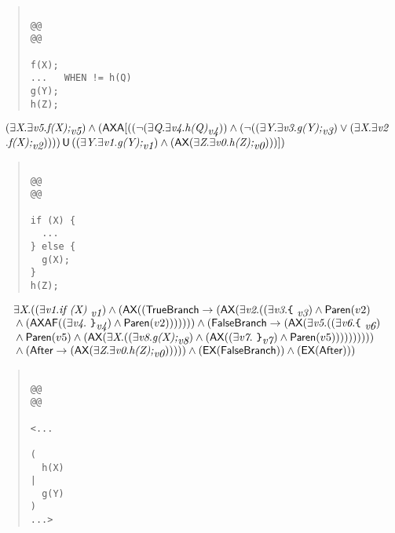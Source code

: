 \documentclass{article}
\newcommand{\U}{\,\mbox{\sf{U}}\,}
\newcommand{\A}{\mbox{\sf{A}}}
\newcommand{\AX}{\mbox{\sf{AX}}}
\newcommand{\EX}{\mbox{\sf{EX}}}
\newcommand{\AF}{\mbox{\sf{AF}}}
\newcommand{\mita}[1]{\mbox{\it{{#1}}}}
\newcommand{\msf}[1]{\mbox{\sf{{#1}}}}
\newcommand{\ttlb}{\mbox{\tt \char'173}}
\newcommand{\ttrb}{\mbox{\tt \char'175}}
\begin{document}
\begin{quote}\begin{verbatim}

@@
@@

f(X);
...   WHEN != h(Q)
g(Y);
h(Z);
\end{verbatim}\end{quote}

\[\begin{array}{l}
(\exists \mita{X} . \exists \mita{v5} . \mita{f(X);}_{\mita{v5}}) \wedge (\AX\A[((\neg (\exists \mita{Q} . \exists \mita{v4} . \mita{h(Q)}_{\mita{v4}})) \wedge (\neg ((\exists \mita{Y} . \exists \mita{v3} . \mita{g(Y);}_{\mita{v3}}) \vee (\exists \mita{X} . \exists \mita{v2}\\\mbox{} . \mita{f(X);}_{\mita{v2}})))) \U ((\exists \mita{Y} . \exists \mita{v1} . \mita{g(Y);}_{\mita{v1}}) \wedge (\AX(\exists \mita{Z} . \exists \mita{v0} . \mita{h(Z);}_{\mita{v0}})))]
)
\end{array}\]

\begin{quote}\begin{verbatim}

@@
@@

if (X) {
  ...
} else {
  g(X);
}
h(Z);
\end{verbatim}\end{quote}

\[\begin{array}{l}
\exists \mita{X} . ((\exists \mita{v1} . \mita{if (X) }_{\mita{v1}}) \wedge (\AX((\msf{TrueBranch} \rightarrow (\AX(\exists \mita{v2} . ((\exists \mita{v3} . \mita{{\ttlb}
  }_{\mita{v3}}) \wedge \msf{Paren}(v2)\\\mbox{} \wedge (\AX\AF((\exists \mita{v4} . \mita{
{\ttrb}}_{\mita{v4}}) \wedge \msf{Paren}(v2))))))) \wedge (\msf{FalseBranch} \rightarrow (\AX(\exists \mita{v5} . ((\exists \mita{v6} . \mita{{\ttlb}
  }_{\mita{v6}})\\\mbox{} \wedge \msf{Paren}(v5) \wedge (\AX(\exists \mita{X} . ((\exists \mita{v8} . \mita{g(X);}_{\mita{v8}}) \wedge (\AX((\exists \mita{v7} . \mita{
{\ttrb}}_{\mita{v7}}) \wedge \msf{Paren}(v5))))))))))\\\mbox{} \wedge (\msf{After} \rightarrow (\AX(\exists \mita{Z} . \exists \mita{v0} . \mita{h(Z);}_{\mita{v0}}))))) \wedge (\EX(\msf{FalseBranch})) \wedge (\EX(\msf{After})))
\end{array}\]

\begin{quote}\begin{verbatim}

@@
@@

<...
  
(
  h(X)
|
  g(Y)
)
...>
\end{verbatim}\end{quote}
\end{document}
